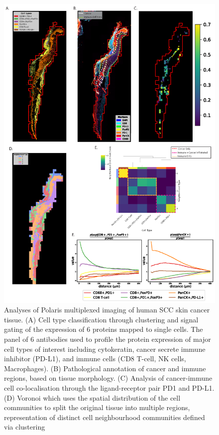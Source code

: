 \begin{figure}
    \centering
    \includegraphics[width=0.8\columnwidth]{Chapter3/Figures/Minh_figure3-01.png}
    \caption{Analyses of Polaris multiplexed imaging of human SCC skin cancer tissue. (A) Cell type classification through clustering and signal gating of the expression of 6 proteins mapped to single cells. The panel of 6 antibodies used to profile the protein expression of major cell types of interest including cytokeratin, cancer secrete immune inhibitor (PD-L1), and immune cells (CD8 T-cell, NK cells, Macrophages). (B) Pathological annotation of cancer and immune regions, based on tissue morphology. (C) Analysis of cancer-immune cell co-localisation through the ligand-receptor pair PD1 and PD-L1. (D) Voronoi which uses the spatial distribution of the cell communities to split the original tissue into multiple regions, representation of distinct cell neighbourhood communities defined via clustering}
    \label{fig:skin_cancer_polaris}
    
\end{figure}

